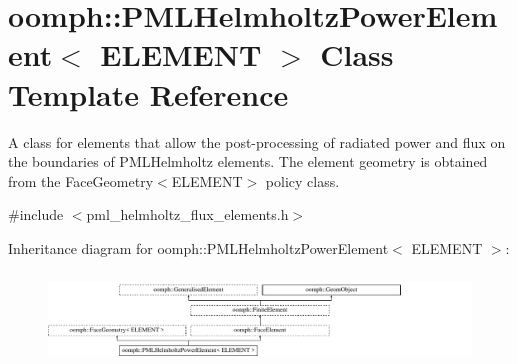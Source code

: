 \hypertarget{classoomph_1_1PMLHelmholtzPowerElement}{}\section{oomph\+:\+:P\+M\+L\+Helmholtz\+Power\+Element$<$ E\+L\+E\+M\+E\+NT $>$ Class Template Reference}
\label{classoomph_1_1PMLHelmholtzPowerElement}


A class for elements that allow the post-\/processing of radiated power and flux on the boundaries of P\+M\+L\+Helmholtz elements. The element geometry is obtained from the Face\+Geometry$<$\+E\+L\+E\+M\+E\+N\+T$>$ policy class.  




{\ttfamily \#include $<$pml\+\_\+helmholtz\+\_\+flux\+\_\+elements.\+h$>$}

Inheritance diagram for oomph\+:\+:P\+M\+L\+Helmholtz\+Power\+Element$<$ E\+L\+E\+M\+E\+NT $>$\+:\begin{figure}[H]
\begin{center}
\leavevmode
\includegraphics[height=2.448087cm]{classoomph_1_1PMLHelmholtzPowerElement}
\end{center}
\end{figure}
